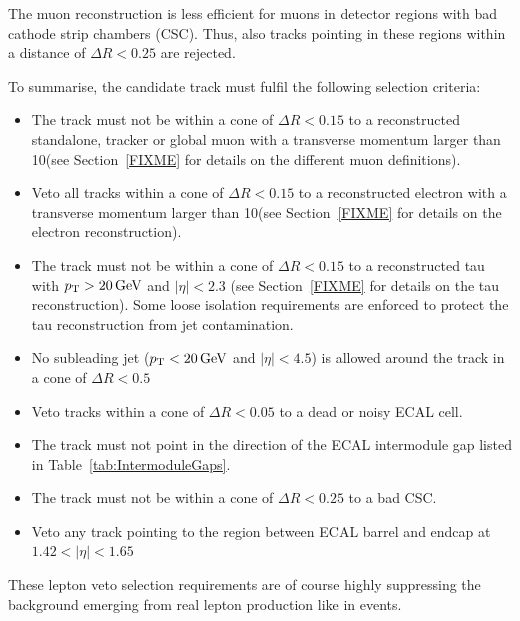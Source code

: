The muon reconstruction is less efficient for muons in detector regions with bad cathode strip chambers (CSC).
Thus, also tracks pointing in these regions within a distance of $\Delta R<0.25$ are rejected.


To summarise, the candidate track must fulfil the following selection criteria:
\begin{itemize}
\renewcommand{\labelitemi}{\footnotesize{\ding{118}}}
\item The track must not be within a cone of $\Delta R<0.15$ to a reconstructed standalone, tracker or global muon with a transverse momentum larger than 10\gev (see Section~\ref{FIXME} for details on the different muon definitions).
\item Veto all tracks within a cone of $\Delta R<0.15$ to a reconstructed electron with a transverse momentum larger than 10\gev (see Section~\ref{FIXME} for details on the electron reconstruction).
\item The track must not be within a cone of $\Delta R<0.15$ to a reconstructed tau with $p_{\text{T}}>20\,\text{Ge}\kern-0.06667em\text{V}$ and $|\eta|<2.3$ (see Section~\ref{FIXME} for details on the tau reconstruction). 
      Some loose isolation requirements are enforced to protect the tau reconstruction from jet contamination.
\item No subleading jet ($p_{\text{T}}<20\,\text{Ge}\kern-0.06667em\text{V}$ and $|\eta|<4.5$) is allowed around the track in a cone of $\Delta R< 0.5$
\item Veto tracks within a cone of $\Delta R<0.05$ to a dead or noisy ECAL cell.
\item The track must not point in the direction of the ECAL intermodule gap listed in Table~\ref{tab:IntermoduleGaps}.
\item The track must not be within a cone of $\Delta R<0.25$ to a bad CSC.
\item Veto any track pointing to the region between ECAL barrel and endcap at $1.42<|\eta|<1.65$
\end{itemize}
These lepton veto selection requirements are of course highly suppressing the background emerging from real lepton production like in \WJets events.
